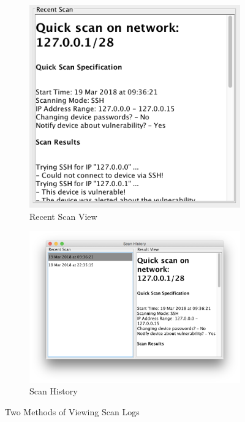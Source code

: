 \begin{figure}[h]
	\begin{subfigure}[h]{0.5\linewidth}
		\includegraphics[width=\linewidth]{img/recent_scan_view_screenshot.png}
		\caption{Recent Scan View}
	\end{subfigure}
	\hfill
	\begin{subfigure}[h]{0.6\linewidth}
		\includegraphics[width=\linewidth]{img/scan_history_screenshot.png}
		\caption{Scan History}
	\end{subfigure}
	\caption{Two Methods of Viewing Scan Logs}
\end{figure}

